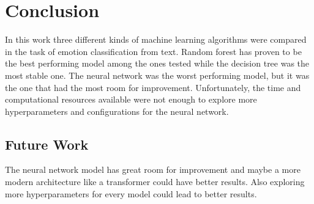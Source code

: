 \section{Conclusion}
\label{sec:conclusion}

In this work three different kinds of
machine learning algorithms were compared
in the task of emotion classification from
text. Random forest has proven to be the best
performing model among the ones tested while
the decision tree was the most stable one.
The neural network was the worst performing
model, but it was the one that had the most
room for improvement. Unfortunately, the
time and computational resources available
were not enough to explore more hyperparameters
and configurations for the neural network.

\subsection{Future Work}
\label{sec:future_work}

The neural network model has great room for
improvement and maybe a more modern 
architecture like a transformer could have
better results. Also exploring more
hyperparameters for every model could
lead to better results.
